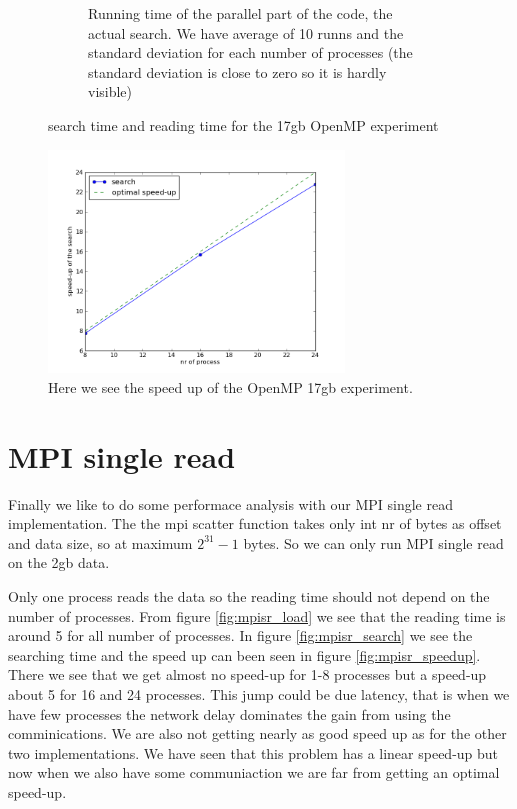 \documentclass[a4paper,10pt]{article}
\begin{document}
\begin{figure}[h!t]
\begin{subfigure}[b]{0.70\textwidth}
                \caption{Running time of the parallel part of the code, the actual search. 
                         We have average of 10 runns and the standard deviation for each number
                         of processes (the standard deviation is close to zero so it is hardly 
                         visible)}
                \label{fig:mpio_search}
        \end{subfigure}
        \caption{search time and reading time for the 17gb OpenMP experiment}
\end{figure}

\begin{figure}[htb]
  \centering
  \includegraphics[width=0.7\textwidth]{graphics/mpio17gb/search_speedup.png}
  \caption{Here we see the speed up of the OpenMP 17gb experiment.}
  \label{fig:mpio_speedup}
\end{figure}
\clearpage

\section{MPI single read}
  Finally we like to do some performace analysis with our MPI single read implementation.
  The the mpi scatter function takes only int nr of bytes as offset and data size, so at maximum $2^{31}-1$ bytes.
  So we can only run MPI single read on the 2gb data.

  Only one process reads the data so the reading time should not depend on the number of processes.
  From figure \ref{fig:mpisr_load} we see that the reading time is around 5 for all number of processes.
  In figure \ref{fig:mpisr_search} we see the searching time and the speed up can been seen in 
  figure \ref{fig:mpisr_speedup}. There we see that we get almost no speed-up for 
  1-8 processes but a speed-up about 5 for 16 and 24 processes.  
  This jump could be due latency, that is when we have few processes the network delay
  dominates the gain from using the comminications.
  We are also not getting nearly as good speed up as for the other two implementations.
  We have seen that this problem has a linear speed-up but now when we also have some communiaction
  we are far from getting an optimal speed-up.
\end{document}
